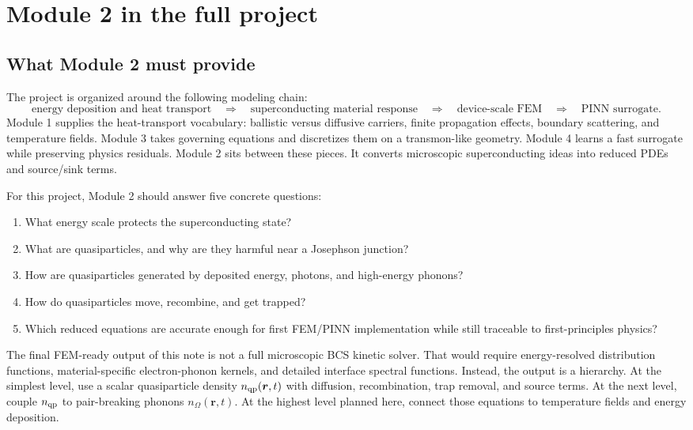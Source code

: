 \documentclass[11pt]{article}
\newcommand{\br}{{\bm{r}}}
\begin{document}
\section{Module 2 in the full project}

\subsection{What Module 2 must provide}
The project is organized around the following modeling chain:
\begin{equation}
\text{energy deposition and heat transport}
\quad\Rightarrow\quad
\text{superconducting material response}
\quad\Rightarrow\quad
\text{device-scale FEM}
\quad\Rightarrow\quad
\text{PINN surrogate}.
\end{equation}
Module 1 supplies the heat-transport vocabulary: ballistic versus diffusive carriers, finite propagation effects, boundary scattering, and temperature fields. Module 3 takes governing equations and discretizes them on a transmon-like geometry. Module 4 learns a fast surrogate while preserving physics residuals. Module 2 sits between these pieces. It converts microscopic superconducting ideas into reduced PDEs and source/sink terms.

For this project, Module 2 should answer five concrete questions:
\begin{enumerate}[leftmargin=1.6em]
    \item What energy scale protects the superconducting state?
    \item What are quasiparticles, and why are they harmful near a Josephson junction?
    \item How are quasiparticles generated by deposited energy, photons, and high-energy phonons?
    \item How do quasiparticles move, recombine, and get trapped?
    \item Which reduced equations are accurate enough for first FEM/PINN implementation while still traceable to first-principles physics?
\end{enumerate}

The final FEM-ready output of this note is not a full microscopic BCS kinetic solver. That would require energy-resolved distribution functions, material-specific electron-phonon kernels, and detailed interface spectral functions. Instead, the output is a hierarchy. At the simplest level, use a scalar quasiparticle density $n_{\qp}(\br,t)$ with diffusion, recombination, trap removal, and source terms. At the next level, couple $n_{\mathrm{qp}}$ to pair-breaking phonons $n_{\Omega}(\br,t)$. At the highest level planned here, connect those equations to temperature fields and energy deposition.
\end{document}
